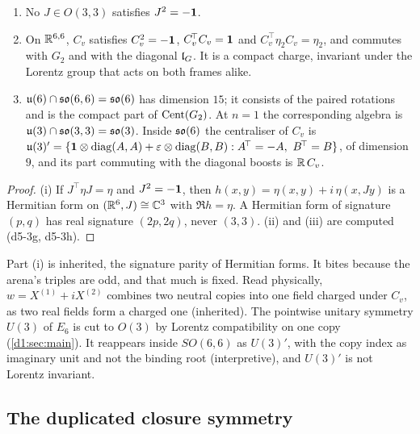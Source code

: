 \begin{proposition}
\label{d5:prop:cx}
\begin{enumerate}[label=(\roman*),leftmargin=2.2em]
\item No $J\in O(3,3)$ satisfies $J^2=-\mathbf 1$.
\item On $\mathbb{R}^{6,6}$, $C_v$ satisfies $C_v^2=-\mathbf 1$, $C_v^{\!\top}C_v=\mathbf 1$ and $C_v^{\!\top}\eta_2C_v=\eta_2$, and commutes with $G_2$ and with the diagonal
$\mathfrak l_G$. It is a compact charge, invariant under the Lorentz group that acts on both frames alike.
\item $\mathfrak{u}(6)\cap\mathfrak{so}(6,6)=\mathfrak{so}(6)$ has dimension $15$; it consists of the paired rotations and is the compact part of $\operatorname{Cent}(G_2)$. At $n=1$ the
corresponding algebra is $\mathfrak{u}(3)\cap\mathfrak{so}(3,3)=\mathfrak{so}(3)$. Inside $\mathfrak{so}(6)$ the centraliser of $C_v$ is
$\uu3'=\{\id\otimes\operatorname{diag}(A,A)+\varepsilon\otimes\operatorname{diag}(B,B):A^{\!\top}=-A,\ B^{\!\top}=B\}$, of dimension $9$, and its part
commuting with the diagonal boosts is $\mathbb{R}\,C_v$.
\end{enumerate}
\end{proposition}

\begin{proof}
(i) If $J^{\!\top}\eta J=\eta$ and $J^2=-\mathbf 1$, then $h(x,y)=\eta(x,y)+i\,\eta(x,Jy)$ is a Hermitian form on $(\mathbb{R}^6,J)\cong\mathbb{C}^3$ with $\Re h=\eta$. A
Hermitian form of signature $(p,q)$ has real signature $(2p,2q)$, never $(3,3)$. (ii) and (iii) are computed (d5-3g, d5-3h).
\end{proof}

Part (i) is inherited, the signature parity of Hermitian forms. It bites because the arena's triples are odd, and that much is fixed. Read
physically, $w=X^{(1)}+iX^{(2)}$ combines two neutral copies into one field charged under $C_v$, as two real fields form a charged one
(inherited). The pointwise unitary symmetry $U(3)$ of $E_6$ is cut to $O(3)$ by Lorentz compatibility on one copy
(\cref{d1:sec:main}). It reappears inside $SO(6,6)$ as $U(3)'$, with the copy index as imaginary unit and not the binding root
(interpretive), and $U(3)'$ is not Lorentz invariant.

\subsection{The duplicated closure symmetry}
\label{d5:sec:closure}

